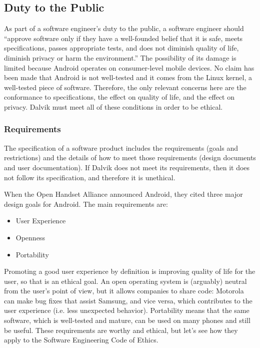 \documentclass[11pt]{article}
\begin{document}
\begin{multicols}{2}

\subsection{Duty to the Public} %
\label{sub:public}

As part of a software engineer's duty to the public, a software engineer should
``approve software only if they have a well-founded belief that it is safe,
meets specifications, passes appropriate tests, and does not diminish quality of
life, diminish privacy or harm the environment.'' \cite[\S~1.03]{secode}  The
possibility of its damage is limited because Android operates on consumer-level
mobile devices.  No claim has been made that Android is not well-tested and it
comes from the Linux kernel, a well-tested piece of software.  Therefore, the
only relevant concerns here are the conformance to specifications, the effect on
quality of life, and the effect on privacy.  Dalvik must meet all of these
conditions in order to be ethical.

\subsubsection{Requirements} %
\label{ssub:requirements}

The specification of a software product includes the requirements (goals and
restrictions) and the details of how to meet those requirements (design
documents and user documentation).  If Dalvik does not meet its requirements,
then it does not follow its specification, and therefore it is unethical.

When the Open Handset Alliance announced Android, they cited three major
design goals for Android.  The main requirements are: \cite{open-handset-alliance-ann}

\begin{itemize}
    \item User Experience
    \item Openness
    \item Portability
\end{itemize}

Promoting a good user experience by definition is improving quality of life for
the user, so that is an ethical goal.  An open operating system is (arguably)
neutral from the user's point of view, but it allows companies to share code:
Motorola can make bug fixes that assist Samsung, and vice versa, which
contributes to the user experience (i.e. less unexpected behavior).  Portability
means that the same software, which is well-tested and mature, can be used on
many phones and still be useful.  These requirements are worthy and ethical, but let's
see how they apply to the Software Engineering Code of Ethics.


\end{multicols}
\end{document}
